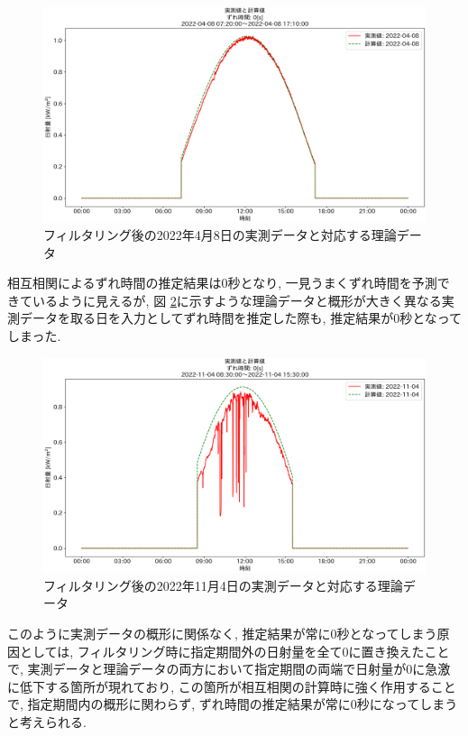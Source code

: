 \documentclass[a4j,12pt,]{jarticle}
\begin{document}
\begin{figure}[H]
  \begin{center}
    \includegraphics[width=160mm]{2022-04-08_partial_corr.png}
    \caption{フィルタリング後の2022年4月8日の実測データと対応する理論データ}
    \label{p6}
  \end{center}
\end{figure}

相互相関によるずれ時間の推定結果は0秒となり, 一見うまくずれ時間を予測できているように見えるが, 図 \ref{p7}に示すような理論データと概形が大きく異なる実測データを取る日を入力としてずれ時間を推定した際も, 推定結果が0秒となってしまった. 

\begin{figure}[H]
  \begin{center}
    \includegraphics[width=160mm]{2022-11-04_partial_corr.png}
    \caption{フィルタリング後の2022年11月4日の実測データと対応する理論データ}
    \label{p7}
  \end{center}
\end{figure}

このように実測データの概形に関係なく, 推定結果が常に0秒となってしまう原因としては, フィルタリング時に指定期間外の日射量を全て0に置き換えたことで, 実測データと理論データの両方において指定期間の両端で日射量が0に急激に低下する箇所が現れており, この箇所が相互相関の計算時に強く作用することで, 指定期間内の概形に関わらず, ずれ時間の推定結果が常に0秒になってしまうと考えられる. 
\end{document}
